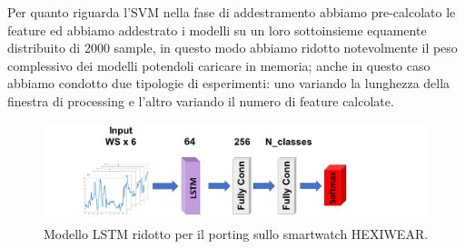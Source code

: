 Per quanto riguarda l'SVM nella fase di addestramento abbiamo pre-calcolato le feature ed abbiamo addestrato i modelli su un loro sottoinsieme equamente distribuito di 2000 sample, in questo modo abbiamo ridotto notevolmente il peso complessivo dei modelli potendoli caricare in memoria; anche in questo caso abbiamo condotto due tipologie di esperimenti: uno variando la lunghezza della finestra di processing e l'altro variando il numero di feature calcolate.

\begin{figure}[!htb]
    \centering
    \includegraphics[width=\textwidth]{figure/lstm_model_64.png}
    \caption{Modello LSTM ridotto per il porting sullo smartwatch HEXIWEAR.}
    \label{fig:lstm-models-port}
\end{figure}